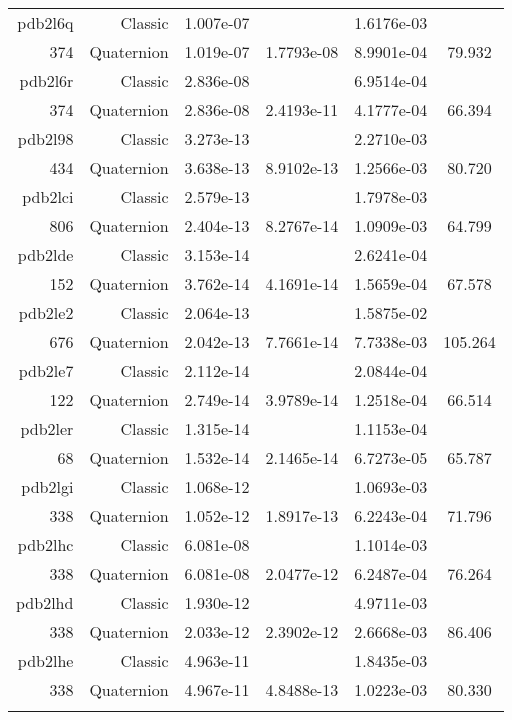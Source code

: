 \begin{xltabular}{\textwidth}{r|rS[table-format=1.3e+2]S[table-format=1.4e+2]S[table-format=1.4e+2]S[table-format=-1.3]}
pdb2l6q & Classic & 1.007e-07 &  & 1.6176e-03 & \\
374 & Quaternion & 1.019e-07 & 1.7793e-08 & 8.9901e-04 & 79.932\\  \addlinespace
pdb2l6r & Classic & 2.836e-08 &  & 6.9514e-04 & \\
374 & Quaternion & 2.836e-08 & 2.4193e-11 & 4.1777e-04 & 66.394\\  \addlinespace
pdb2l98 & Classic & 3.273e-13 &  & 2.2710e-03 & \\
434 & Quaternion & 3.638e-13 & 8.9102e-13 & 1.2566e-03 & 80.720\\  \addlinespace
pdb2lci & Classic & 2.579e-13 &  & 1.7978e-03 & \\
806 & Quaternion & 2.404e-13 & 8.2767e-14 & 1.0909e-03 & 64.799\\  \addlinespace
pdb2lde & Classic & 3.153e-14 &  & 2.6241e-04 & \\
152 & Quaternion & 3.762e-14 & 4.1691e-14 & 1.5659e-04 & 67.578\\  \addlinespace
pdb2le2 & Classic & 2.064e-13 &  & 1.5875e-02 & \\
676 & Quaternion & 2.042e-13 & 7.7661e-14 & 7.7338e-03 & 105.264\\  \addlinespace
pdb2le7 & Classic & 2.112e-14 &  & 2.0844e-04 & \\
122 & Quaternion & 2.749e-14 & 3.9789e-14 & 1.2518e-04 & 66.514\\  \addlinespace
pdb2ler & Classic & 1.315e-14 &  & 1.1153e-04 & \\
68 & Quaternion & 1.532e-14 & 2.1465e-14 & 6.7273e-05 & 65.787\\  \addlinespace
pdb2lgi & Classic & 1.068e-12 &  & 1.0693e-03 & \\
338 & Quaternion & 1.052e-12 & 1.8917e-13 & 6.2243e-04 & 71.796\\  \addlinespace
pdb2lhc & Classic & 6.081e-08 &  & 1.1014e-03 & \\
338 & Quaternion & 6.081e-08 & 2.0477e-12 & 6.2487e-04 & 76.264\\  \addlinespace
pdb2lhd & Classic & 1.930e-12 &  & 4.9711e-03 & \\
338 & Quaternion & 2.033e-12 & 2.3902e-12 & 2.6668e-03 & 86.406\\  \addlinespace
pdb2lhe & Classic & 4.963e-11 &  & 1.8435e-03 & \\
338 & Quaternion & 4.967e-11 & 4.8488e-13 & 1.0223e-03 & 80.330\\  \addlinespace

\end{xltabular}
